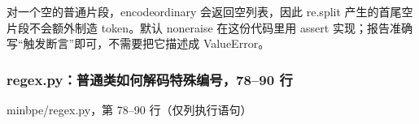 \documentclass[11pt,a4paper]{article}
\newlength{\BpeDocTableWidth}
\newcommand{\BpeDocCodeInline}[1]{{\ttfamily #1}}
\newcommand{\BpeDocSubsubsection}[2]{\subsubsection{\texorpdfstring{#1}{#2}}}
\begin{document}
对一个空的普通片段，\BpeDocCodeInline{encode\relax\allowbreak{}ordinary} 会返回空列表，因此 \BpeDocCodeInline{re.\allowbreak{}split} 产生的首尾空片段不会额外制造 \BpeDocCodeInline{token}。默认 \BpeDocCodeInline{none\relax\allowbreak{}raise} 在这份代码里用 \BpeDocCodeInline{assert} 实现；报告准确写“触发断言”即可，不需要把它描述成 \BpeDocCodeInline{ValueError}。


\BpeDocSubsubsection{\BpeDocCodeInline{regex.\allowbreak{}py}：普通类如何解码特殊编号，78–90 行}{regex.py：普通类如何解码特殊编号，78–90 行}


\begingroup\fontsize{8.9}{12.2}\selectfont{}
\setlength{\BpeDocTableWidth}{\dimexpr\linewidth-6\tabcolsep\relax}
\renewcommand{\arraystretch}{1.08}
{\small \BpeDocCodeInline{minbpe/\allowbreak{}regex.\allowbreak{}py}，第 78–90 行（仅列执行语句）}
\end{document}
